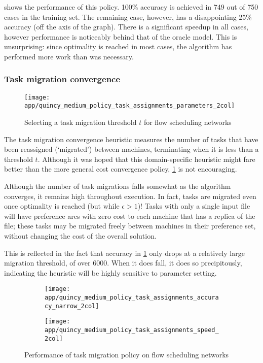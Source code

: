  shows the performance of this policy. 100\% accuracy is achieved in 749 out of 750 cases in the training set. The remaining case, however, has a disappointing 25\% accuracy (off the axis of the graph). There is a significant speedup in all cases, however performance is noticeably behind that of the oracle model. This is unsurprising: since optimality is reached in most cases, the algorithm has performed more work than was necessary.

\subsubsection{Task migration convergence}

\begin{figure}
    \centering
    \texttt{[image: app/quincy\_medium\_policy\_task\_assignments\_parameters\_2col]}
    \caption{Selecting a task migration threshold $t$ for flow scheduling networks}
    \label{fig:app-quincy-medium-task-assignment-parameters}
\end{figure}

The task migration convergence heuristic measures the number of tasks that have been reassigned (`migrated') between machines, terminating when it is less than a threshold $t$. Although it was hoped that this domain-specific heuristic might fare better than the more general cost convergence policy, \cref{fig:app-quincy-medium-task-assignment-parameters} is not encouraging. 

Although the number of task migrations falls somewhat as the algorithm converges, it remains high throughout execution. In fact, tasks are migrated even once optimality is reached (but while $\epsilon > 1$)! Tasks with only a single input file will have preference arcs with zero cost to each machine that has a replica of the file; these tasks may be migrated freely between machines in their preference set, without changing the cost of the overall solution.

This is reflected in the fact that accuracy in \cref{fig:app-quincy-medium-task-assignment-parameters} only drops at a relatively large migration threshold, of over $6000$. When it does fall, it does so precipitously, indicating the heuristic will be highly sensitive to parameter setting.

\begin{figure}
    \begin{widepage}
        \begin{subfigure}[c]{0.5\textwidth}
            \texttt{[image: app/quincy\_medium\_policy\_task\_assignments\_accuracy\_narrow\_2col]}
        \end{subfigure}
        \begin{subfigure}[c]{0.5\textwidth}
            \texttt{[image: app/quincy\_medium\_policy\_task\_assignments\_speed\_2col]}
        \end{subfigure}
    \end{widepage}
    \caption{Performance of task migration policy on flow scheduling networks}
    \label{fig:app-quincy-medium-task-assignment-cdf}
\end{figure}

